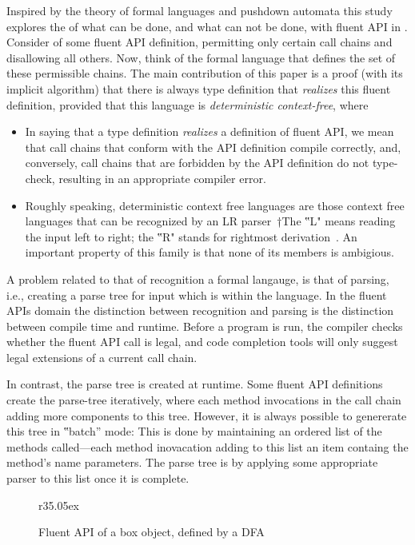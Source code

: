Inspired by the theory of formal languages and pushdown automata
this study explores the of what can be done, and what can not be done, with fluent API in \Java.
Consider of some fluent API definition, permitting only certain call
chains and disallowing all others.
Now, think of the formal language that defines the set of these permissible chains.
The main contribution of this paper is a proof (with its implicit algorithm) that
there is always \Java type definition that \emph{realizes} this fluent definition, provided that this
language is \emph{deterministic context-free}, where
\begin{itemize}
  \item In saying that a type definition \emph{realizes} a definition of fluent
    API, we mean that call chains that conform with the API definition compile
    correctly, and, conversely, call chains that are forbidden by the API
    definition do not type-check, resulting in an appropriate compiler error.
  \item Roughly speaking, deterministic context free languages are those
    context free languages that can be recognized by an LR parser~†{The ‟L"
    means reading the input left to right; the ‟R" stands for rightmost derivation}~\cite{Aho:86}.
    An important property of this family is that none of its members is ambigious.
\end{itemize}

A problem related to that of recognition a formal langauge,
  is that of parsing, i.e., creating a parse tree for input which is within the language.
In the fluent APIs domain the distinction between recognition and parsing is
  the distinction between compile time and runtime.
Before a program is run, the compiler checks whether the fluent API call is legal,
  and code completion tools will only suggest legal extensions of a current call chain.

In contrast, the parse tree is created at runtime.
Some fluent API definitions create the parse-tree
  iteratively, where each method invocations in the call chain adding
  more components to this tree.
However, it is always possible to genererate this tree in ‟batch” mode:
This is done by maintaining an ordered list of the methods
  called---each method inovacation adding to this list an item containg the method's name
  parameters.
The parse tree is by applying some appropriate parser to this list
  once it is complete.

\begin{wrapfigure}[9]r{35.05ex}
\caption{\label{Figure:box}Fluent API of a box object, defined by a DFA}

  
\end{wrapfigure}

